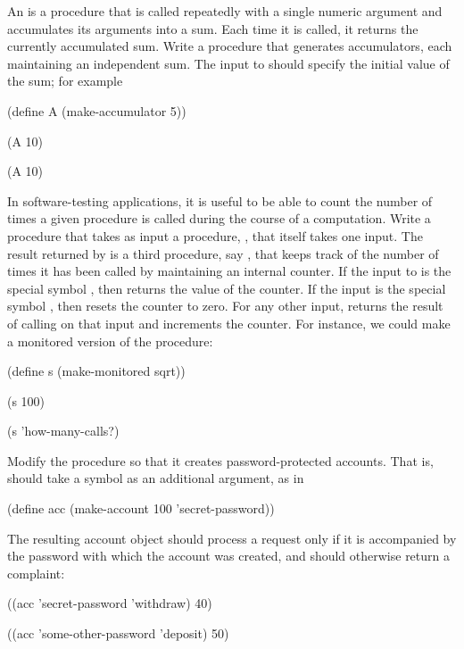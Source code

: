 \begin{exercise}
	\label{Exercise 3.1}
	An  is a procedure that is called repeatedly with a single numeric argument and accumulates its arguments into a sum.
	Each time it is called, it returns the currently accumulated sum.
	Write a procedure  that generates accumulators, each maintaining an independent sum.
	The input to  should specify the initial value of the sum;
	for example
	\begin{scheme}
	  (define A (make-accumulator 5))

	  (A 10)
	  ~~

	  (A 10)
	  ~~
	\end{scheme}
\end{exercise}



\begin{exercise}
	\label{Exercise 3.2}
	In software-testing applications, it is useful to be able to count the number of times a given procedure is called during the course of a computation.
	Write a procedure  that takes as input a procedure, , that itself takes one input.
	The result returned by  is a third procedure, say , that keeps track of the number of times it has been called by maintaining an internal counter.
	If the input to  is the special symbol , then  returns the value of the counter.
	If the input is the special symbol , then  resets the counter to zero.
	For any other input,  returns the result of calling  on that input and increments the counter.
	For instance, we could make a monitored version of the  procedure:
	\begin{scheme}
	  (define s (make-monitored sqrt))

	  (s 100)
	  ~\outprint{10}~

	  (s 'how-many-calls?)
	  ~\outprint{1}~
	\end{scheme}
\end{exercise}



\begin{exercise}
	\label{Exercise 3.3}
	Modify the  procedure so that it creates password-protected accounts.
	That is,  should take a symbol as an additional argument, as in
	\begin{scheme}
	  (define acc (make-account 100 'secret-password))
	\end{scheme}
	The resulting account object should process a request only if it is accompanied by the password with which the account was created, and should otherwise return a complaint:
	\begin{scheme}
	  ((acc 'secret-password 'withdraw) 40)
	  ~\outprint{60}~

	  ((acc 'some-other-password 'deposit) 50)
	  ~\outprint{"Incorrect password"}~
	\end{scheme}
\end{exercise}




